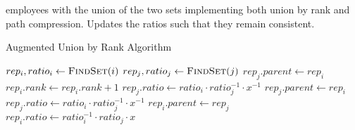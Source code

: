 \documentclass[12pt,twoside]{article}
\begin{document}
\begin{problems}
\begin{itemize}
        employees with the union of the two sets implementing both union by rank
        and path compression. Updates the ratios such that they remain consistent.
        \begin{breakablealgorithm}
            \caption{Augmented Union by Rank Algorithm}
            \begin{algorithmic}[1]
                    \State $rep_i, ratio_i \leftarrow \Call{FindSet}{i}$
                    \State $rep_j, ratio_j \leftarrow \Call{FindSet}{j}$
                        \State $rep_j.parent \leftarrow rep_i$
                        \State $rep_i.rank \leftarrow rep_i.rank + 1$
                        \State $rep_j.ratio \leftarrow ratio_i \cdot ratio_j^{-1} \cdot x^{-1}$
                        \State $rep_j.parent \leftarrow rep_i$
                        \State $rep_j.ratio \leftarrow ratio_i \cdot ratio_j^{-1} \cdot x^{-1}$
                        \State $rep_i.parent \leftarrow rep_j$
                        \State $rep_i.ratio \leftarrow ratio_i^{-1} \cdot ratio_j \cdot x$
                    \EndIf
                \EndFunction
            \end{algorithmic}
        \end{breakablealgorithm}
\end{itemize}


\end{problems}
\end{document}
